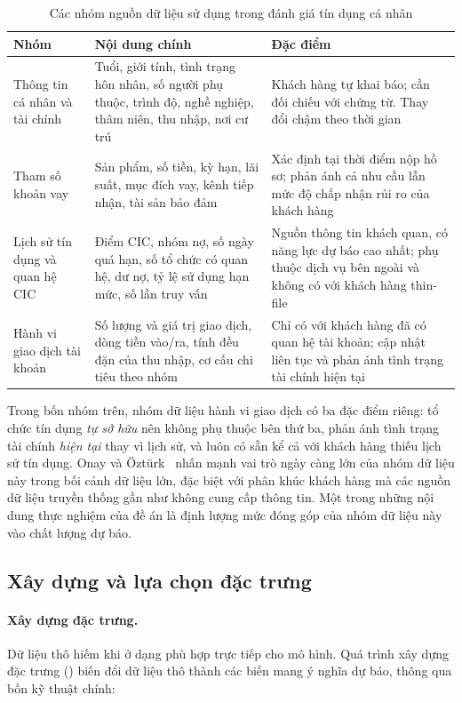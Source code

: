\begin{table}[htbp]
\centering
\caption{Các nhóm nguồn dữ liệu sử dụng trong đánh giá tín dụng cá nhân}
\label{tab:nhom-du-lieu}
\small
\begin{tabular}{@{}L{3.0cm}L{4.6cm}L{4.6cm}@{}}
\toprule
\textbf{Nhóm} & \textbf{Nội dung chính} & \textbf{Đặc điểm} \\
\midrule
Thông tin cá nhân và tài chính &
Tuổi, giới tính, tình trạng hôn nhân, số người phụ thuộc, trình độ, nghề nghiệp,
thâm niên, thu nhập, nơi cư trú &
Khách hàng tự khai báo; cần đối chiếu với chứng từ. Thay đổi chậm theo thời gian
\\[2pt]
Tham số khoản vay &
Sản phẩm, số tiền, kỳ hạn, lãi suất, mục đích vay, kênh tiếp nhận, tài sản bảo
đảm &
Xác định tại thời điểm nộp hồ sơ; phản ánh cả nhu cầu lẫn mức độ chấp nhận rủi ro
của khách hàng \\[2pt]
Lịch sử tín dụng và quan hệ CIC &
Điểm CIC, nhóm nợ, số ngày quá hạn, số tổ chức có quan hệ, dư nợ, tỷ lệ sử dụng
hạn mức, số lần truy vấn &
Nguồn thông tin khách quan, có năng lực dự báo cao nhất; phụ thuộc dịch vụ bên
ngoài và không có với khách hàng thin-file \\[2pt]
Hành vi giao dịch tài khoản &
Số lượng và giá trị giao dịch, dòng tiền vào/ra, tính đều đặn của thu nhập, cơ
cấu chi tiêu theo nhóm &
Chỉ có với khách hàng đã có quan hệ tài khoản; cập nhật liên tục và phản ánh tình
trạng tài chính hiện tại \\
\bottomrule
\end{tabular}
\end{table}

Trong bốn nhóm trên, nhóm dữ liệu hành vi giao dịch có ba đặc điểm riêng: tổ chức
tín dụng \textit{tự sở hữu} nên không phụ thuộc bên thứ ba, phản ánh tình trạng
tài chính \textit{hiện tại} thay vì lịch sử, và luôn có sẵn kể cả với khách hàng
thiếu lịch sử tín dụng. Onay và Öztürk~\cite{onay2018} nhấn mạnh vai trò ngày
càng lớn của nhóm dữ liệu này trong bối cảnh dữ liệu lớn, đặc biệt với phân khúc
khách hàng mà các nguồn dữ liệu truyền thống gần như không cung cấp thông tin.
Một trong những nội dung thực nghiệm của đề án là định lượng mức đóng góp của
nhóm dữ liệu này vào chất lượng dự báo.

\subsection{Xây dựng và lựa chọn đặc trưng}
\label{subsec:xay-dung-dac-trung}

\paragraph{Xây dựng đặc trưng.} Dữ liệu thô hiếm khi ở dạng phù hợp trực tiếp cho
mô hình. Quá trình xây dựng đặc trưng () biến đổi dữ
liệu thô thành các biến mang ý nghĩa dự báo, thông qua bốn kỹ thuật chính:

